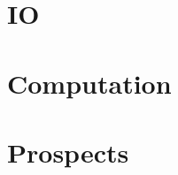 \documentclass[12pt, oneside]{report}
\begin{document}
\chapter{IO}


\chapter{Computation}


\chapter{Prospects}




\appendix

\end{document}
